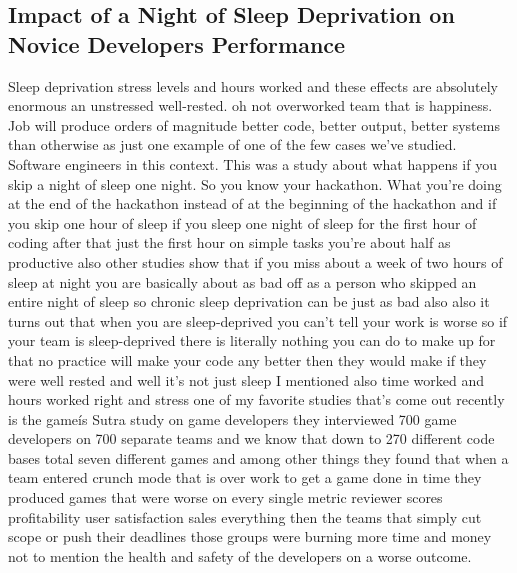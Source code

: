 \documentclass[conference, compsoc, twoside]{IEEEtran}
\begin{document}
\subsection{Impact of a Night of Sleep Deprivation on Novice Developers Performance}
Sleep deprivation stress levels and hours worked and these effects are absolutely enormous an unstressed well-rested. oh not overworked team that is happiness. Job will produce orders of magnitude better code, better output, better systems than otherwise as just one example of one of the few cases we've studied.
Software engineers in this context. This was a study about what happens if you skip a night of sleep one night. 
So you know your hackathon. 
What you're doing at the end of the hackathon instead of at the beginning of the hackathon and if you skip one hour of sleep if you sleep one night of sleep for the first hour of coding after that just the first hour on simple tasks you're about half as productive also other studies show that if you miss about a week of two hours of sleep at night you are basically about as bad off as a person who skipped an entire night of sleep so chronic sleep deprivation can be just as bad also also it turns out that when you are sleep-deprived you can't tell your work is worse so if your team is sleep-deprived there is literally nothing you can do to make up for that no practice will make your code any better then they would make if they were well rested and well it's not just sleep I mentioned also time worked and hours worked right and stress one of my favorite studies that's come out recently is the gameís Sutra study on game developers they interviewed 700 game developers on 700 separate teams and we know that down to 270 different code bases total seven different games and among other things they found that when a team entered crunch mode that is over work to get a game done in time they produced games that were worse on every single metric reviewer scores profitability user satisfaction sales everything then the teams that simply cut scope or push their deadlines those groups were burning more time and money not to mention the health and safety of the developers on a worse outcome. 
\end{document}

